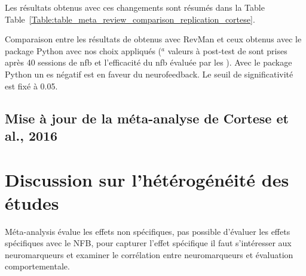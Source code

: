 Les résultats obtenus avec ces changements sont résumés dans la Table Table~\ref{Table:table_meta_review_comparison_replication_cortese}.

\begin{table}[h!]
  \centering
  \caption{Comparaison entre les résultats de \citet{Cortese2016} obtenus avec RevMan \citep{Revman} et ceux obtenus avec le package Python \citep{Bussalb2019a}
	avec nos choix appliqués ($^a$ valeurs à post-test de \citet{Arnold2014} sont prises après 40 sessions de \gls{nfb} et l'efficacité du \gls{nfb} évaluée 
	par les ).
	Avec le package Python un \gls{es} négatif est en faveur du neurofeedback. Le seuil de significativité est fixé à 0.05.}
  
  \label{Table:table_meta_review_comparison_replication_cortese}
\end{table}




\subsection{Mise à jour de la méta-analyse de Cortese et al., 2016}

\section{Discussion sur l'hétérogénéité des études} 

Méta-analysis évalue les effets non spécifiques, pas possible d'évaluer les effets spécifiques avec le NFB, pour capturer l'effet spécifique il faut s'intéresser
aux neuromarqueurs et examiner le corrélation entre neuromarqueurs et évaluation comportementale. 